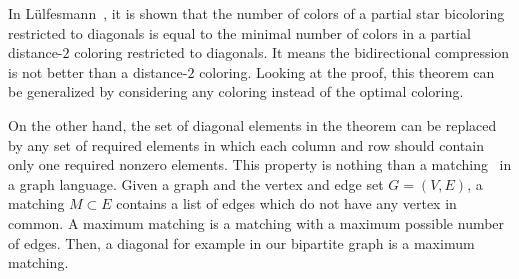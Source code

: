 \documentclass[11pt, twoside,a4paper]{book}
\begin{document}
In Lülfesmann~\cite{Lulfesmann2012Fap}, it is shown that the number of colors of
a partial star bicoloring restricted to diagonals is equal to
the minimal number of colors in a partial distance-$2$ coloring restricted
to diagonals. It means the bidirectional compression is not better than
a distance-$2$ coloring.
Looking at the proof, this theorem can be generalized by considering any
coloring instead of the optimal coloring.

On the other hand, the set of diagonal elements in the theorem
can be replaced by any set of required elements
in which each column and row should contain only one required nonzero elements.
This property is nothing than a matching~\cite{bondy2008graph} in a graph language.
Given a graph and the vertex and edge set $G=(V,E)$, a matching $M\subset E$ contains
a list of edges which do not have any vertex in common.
A maximum matching is a matching with a maximum possible number of edges.
Then, a diagonal for example in our bipartite graph is a maximum matching.
\end{document}
